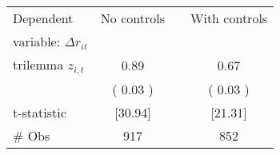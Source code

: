 \begin{tabular}{lccc}
\toprule
Dependent & \multicolumn{1}{c}{No controls} && \multicolumn{1}{c}{With controls} \\
variable: $\Delta r_{it}$       \\
\midrule
trilemma $ z_{i,t}$ &   0.89\sym{***} &&   0.67\sym{***}  \\
& (  0.03 ) && (  0.03 )   \\
t-statistic & [30.94] && [21.31] \\
\# Obs &          917 &&          852 \\
\bottomrule
\end{tabular}
